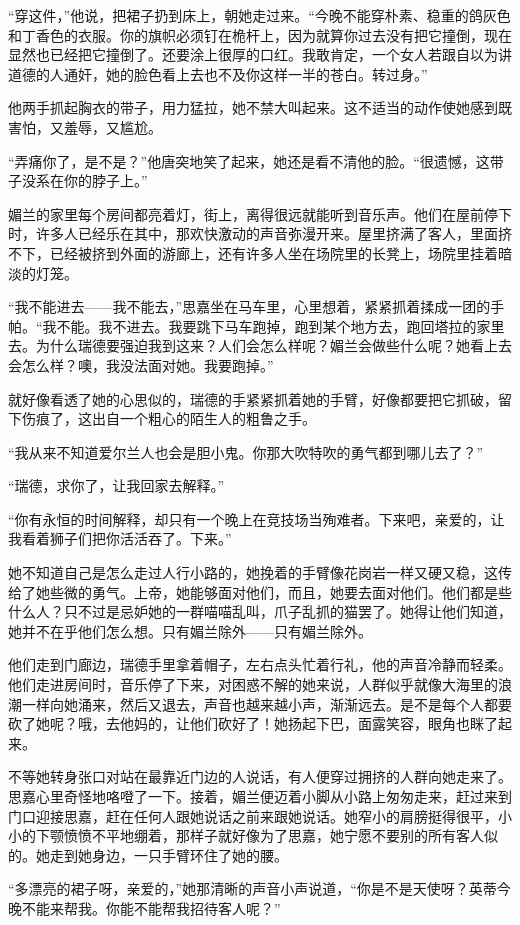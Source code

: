 \par “穿这件，”他说，把裙子扔到床上，朝她走过来。“今晚不能穿朴素、稳重的鸽灰色和丁香色的衣服。你的旗帜必须钉在桅杆上，因为就算你过去没有把它撞倒，现在显然也已经把它撞倒了。还要涂上很厚的口红。我敢肯定，一个女人若跟自以为讲道德的人通奸，她的脸色看上去也不及你这样一半的苍白。转过身。”
\par 他两手抓起胸衣的带子，用力猛拉，她不禁大叫起来。这不适当的动作使她感到既害怕，又羞辱，又尴尬。
\par “弄痛你了，是不是？”他唐突地笑了起来，她还是看不清他的脸。“很遗憾，这带子没系在你的脖子上。”
\par 媚兰的家里每个房间都亮着灯，街上，离得很远就能听到音乐声。他们在屋前停下时，许多人已经乐在其中，那欢快激动的声音弥漫开来。屋里挤满了客人，里面挤不下，已经被挤到外面的游廊上，还有许多人坐在场院里的长凳上，场院里挂着暗淡的灯笼。
\par “我不能进去——我不能去，”思嘉坐在马车里，心里想着，紧紧抓着揉成一团的手帕。“我不能。我不进去。我要跳下马车跑掉，跑到某个地方去，跑回塔拉的家里去。为什么瑞德要强迫我到这来？人们会怎么样呢？媚兰会做些什么呢？她看上去会怎么样？噢，我没法面对她。我要跑掉。”
\par 就好像看透了她的心思似的，瑞德的手紧紧抓着她的手臂，好像都要把它抓破，留下伤痕了，这出自一个粗心的陌生人的粗鲁之手。
\par “我从来不知道爱尔兰人也会是胆小鬼。你那大吹特吹的勇气都到哪儿去了？”
\par “瑞德，求你了，让我回家去解释。”
\par “你有永恒的时间解释，却只有一个晚上在竞技场当殉难者。下来吧，亲爱的，让我看着狮子们把你活活吞了。下来。”
\par 她不知道自己是怎么走过人行小路的，她挽着的手臂像花岗岩一样又硬又稳，这传给了她些微的勇气。上帝，她能够面对他们，而且，她要去面对他们。他们都是些什么人？只不过是忌妒她的一群喵喵乱叫，爪子乱抓的猫罢了。她得让他们知道，她并不在乎他们怎么想。只有媚兰除外——只有媚兰除外。
\par 他们走到门廊边，瑞德手里拿着帽子，左右点头忙着行礼，他的声音冷静而轻柔。他们走进房间时，音乐停了下来，对困惑不解的她来说，人群似乎就像大海里的浪潮一样向她涌来，然后又退去，声音也越来越小声，渐渐远去。是不是每个人都要砍了她呢？哦，去他妈的，让他们砍好了！她扬起下巴，面露笑容，眼角也眯了起来。
\par 不等她转身张口对站在最靠近门边的人说话，有人便穿过拥挤的人群向她走来了。思嘉心里奇怪地咯噔了一下。接着，媚兰便迈着小脚从小路上匆匆走来，赶过来到门口迎接思嘉，赶在任何人跟她说话之前来跟她说话。她窄小的肩膀挺得很平，小小的下颚愤愤不平地绷着，那样子就好像为了思嘉，她宁愿不要别的所有客人似的。她走到她身边，一只手臂环住了她的腰。
\par “多漂亮的裙子呀，亲爱的，”她那清晰的声音小声说道，“你是不是天使呀？英蒂今晚不能来帮我。你能不能帮我招待客人呢？”


